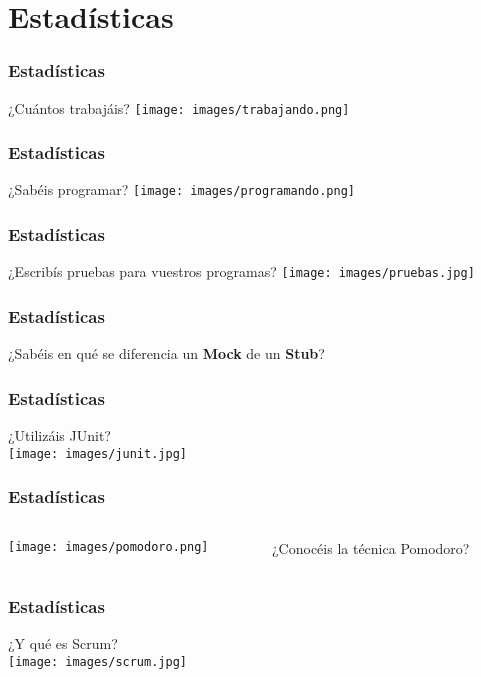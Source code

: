  \section{Estadísticas}

 \begin{frame}
  \frametitle{Estadísticas}

  \begin{center}
   {\Huge ¿Cuántos trabajáis?}
   \texttt{[image: images/trabajando.png]}
  \end{center}
 \end{frame}

 \begin{frame}
  \frametitle{Estadísticas}

  \begin{center}
   {\Huge ¿Sabéis programar?}
   \texttt{[image: images/programando.png]}
  \end{center}
 \end{frame}

 \begin{frame}
  \frametitle{Estadísticas}

  \begin{center}
   {\Huge ¿Escribís pruebas para vuestros programas?}
   \texttt{[image: images/pruebas.jpg]}
  \end{center}
 \end{frame}

 \begin{frame}
  \frametitle{Estadísticas}

  \begin{center}
   {\Huge ¿Sabéis en qué se diferencia un \textbf{Mock} de un \textbf{Stub}?}
  \end{center}
 \end{frame}

 \begin{frame}
  \frametitle{Estadísticas}

  \begin{center}
   {\Huge ¿Utilizáis JUnit?}\\[1pc]
   \texttt{[image: images/junit.jpg]}
  \end{center}
 \end{frame}

 \begin{frame}
  \frametitle{Estadísticas}
   \begin{columns}
    \begin{column}{3cm}
     \begin{center}
      \texttt{[image: images/pomodoro.png]}
     \end{center}
    \end{column}
    \begin{column}{7cm}
      {\Huge ¿Conocéis la técnica Pomodoro?}
    \end{column}
   \end{columns}
 \end{frame}

 \begin{frame}
  \frametitle{Estadísticas}

  \begin{center}
   {\Huge ¿Y qué es Scrum?}\\[1pc]
   \texttt{[image: images/scrum.jpg]}
  \end{center}
 \end{frame}
